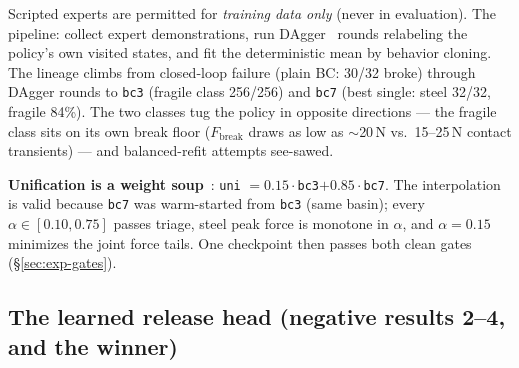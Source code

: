 \documentclass[11pt]{article}
\newcommand{\Fbreak}{\ensuremath{F_{\mathrm{break}}}}
\newcommand{\code}[1]{\texttt{\small #1}}
\begin{document}
Scripted experts are permitted for \emph{training data only} (never in evaluation). The pipeline: collect expert demonstrations, run DAgger~\citep{ross2011dagger} rounds relabeling the policy's own visited states, and fit the deterministic mean by behavior cloning. The lineage climbs from closed-loop failure (plain BC: 30/32 broke) through DAgger rounds to \code{bc3} (fragile class 256/256) and \code{bc7} (best single: steel 32/32, fragile 84\%). The two classes tug the policy in opposite directions --- the fragile class sits on its own break floor (\Fbreak{} draws as low as $\sim$20\,N vs.\ 15--25\,N contact transients) --- and balanced-refit attempts see-sawed.

\textbf{Unification is a weight soup}~\citep{wortsman2022soups}: \code{uni} $= 0.15\cdot$\code{bc3}$+0.85\cdot$\code{bc7}. The interpolation is valid because \code{bc7} was warm-started from \code{bc3} (same basin); every $\alpha\in[0.10,0.75]$ passes triage, steel peak force is monotone in $\alpha$, and $\alpha=0.15$ minimizes the joint force tails. One checkpoint then passes both clean gates (\S\ref{sec:exp-gates}).

\subsection{The learned release head (negative results 2--4, and the winner)}
\label{sec:release}
\end{document}
